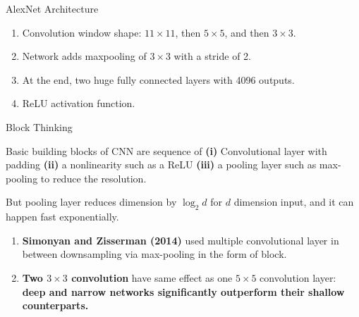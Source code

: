 \documentclass[aspectratio=169,xcolor=dvipsnames,svgnames,x11names,fleqn]{beamer}
\begin{document}
\begin{frame}{AlexNet Architecture}

\begin{enumerate}
\item Convolution window shape: $11\times 11$, then $5\times 5$, and then $3\times 3$.
\item Network adds maxpooling of $3\times 3$ with a stride of 2.
\item At the end,  two huge fully connected layers with 4096 outputs.
\item ReLU activation function.
\end{enumerate}

\end{frame}

\begin{frame}[fragile]{Block Thinking}

\footnotesize

\centering
{}

\vspace{10pt}

\begin{tcolorbox}[colback=white, colframe=blockBlue, arc=1mm, boxrule=0.5pt]
    Basic building blocks of CNN are sequence of \textbf{(i)} Convolutional layer with padding \textbf{(ii)} a nonlinearity such as a ReLU \textbf{(iii)} a pooling layer such as max-pooling to reduce the resolution.
\end{tcolorbox}

\textcolor{red!80!black}{But pooling layer reduces dimension by $\log_2 d$ for $d$ dimension input, and it can happen fast exponentially.}

\begin{enumerate}
    \item \textbf{Simonyan and Zisserman (2014)} used multiple convolutional layer in between downsampling via max-pooling in the form of block.
    \item \textbf{Two $3 \times 3$ convolution} have same effect as one $5\times 5$ convolution layer: \textcolor{logicGreen!70!black}{\textbf{deep and narrow networks significantly outperform their shallow counterparts.}}
\end{enumerate}


\end{frame}
\end{document}
